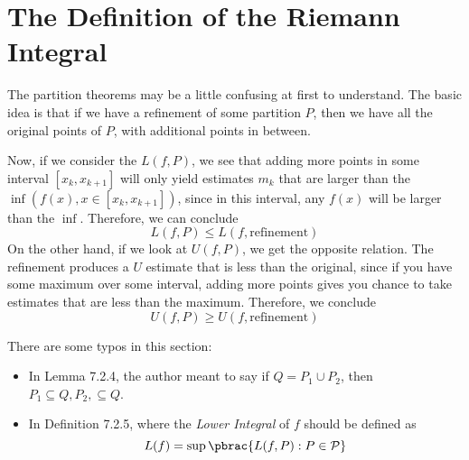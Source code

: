 
\setcounter{section}{1}
\section{The Definition of the Riemann Integral}
\setcounter{exercise}{0}

The partition theorems may be a little confusing at first to understand.
The basic idea is that if we have a refinement of some partition $P$,
then we have all the original points of $P$, with additional points 
in between.

Now, if we consider the $L(f, P)$, we see that adding more points 
in some interval $[x_k, x_{k+1}]$ 
will only yield estimates $m_k$ that are larger than the $\inf(f(x), x \in [x_k, x_{k+1}])$,
since in this interval, any $f(x)$ will be larger than the $\inf$.
Therefore, we can conclude 
\begin{equation*}
  L(f, P) \leq L(f, \text{refinement})
\end{equation*}
On the other hand, if we look at $U(f, P)$, we get the opposite relation.
The refinement produces a $U$ estimate that is less than the original, 
since if you have some maximum over some interval, adding more points 
gives you chance to take estimates that are less than the maximum.
Therefore, we conclude 
\begin{equation*}
  U(f, P) \geq U(f, \text{refinement})
\end{equation*}

There are some typos in this section:
\begin{itemize}
  \item 
  In Lemma 7.2.4, the author meant to say 
  if $Q = P_1 \cup P_2$, then $P_1 \subseteq Q, P_2, \subseteq Q$.

  \item 
  In Definition 7.2.5, where the \textit{Lower Integral} of $f$
  should be defined as
  \begin{equation*}
    L(f) = \sup\pbrac{
      L(f, P) : P \in \mathcal{P}
    }
  \end{equation*}
\end{itemize}


